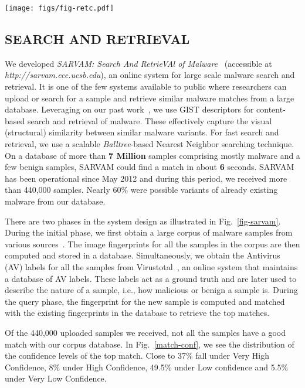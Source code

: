 \documentclass[journal]{IEEEtran}
\begin{document}
\begin{figure*}[t]
\centering
{\texttt{[image: figs/fig-retc.pdf]}}
\caption{Block Schematic of SARVAM}
\label{fig-sarvam}
\end{figure*} 

\subsection*{SEARCH AND RETRIEVAL}

 We developed \emph{SARVAM: Search And RetrieVAl of Malware}~\cite{sarvam} (accessible at {\it http://sarvam.ece.ucsb.edu}), an online system for large scale malware search and retrieval.
It is one of the few systems available to public where researchers can upload or search for a sample and retrieve similar malware matches from a large database.
Leveraging on our past work~\cite{malw-imgs}, we use GIST descriptors for content-based search and retrieval of malware.
These effectively capture the visual (structural) similarity between similar malware variants.
For fast search and retrieval, we use a scalable \emph{Balltree}-based Nearest Neighbor searching technique.
On a database of more than {\bf 7 Million} samples comprising mostly malware and a few benign samples, SARVAM could find a match in about {\bf 6} seconds.  
SARVAM has been operational since May 2012 and during this period, we received more than 440,000 samples.
Nearly 60\% were possible variants of already existing malware from our database.

  There are two phases in the system design as illustrated in Fig.~\ref{fig-sarvam}.
During the initial phase, we first obtain a large corpus of malware samples from various sources~.
The image fingerprints for all the samples in the corpus are then computed and stored in a database.
Simultaneously, we obtain the Antivirus (AV) labels for all the samples from Virustotal~\cite{vtotal}, an online system that maintains a database of AV labels.
These labels act as a ground truth and are later used to describe the nature of a sample, i.e., how malicious or benign a sample is.
During the query phase, the fingerprint for the new sample is computed and matched with the existing fingerprints in the database to retrieve the top matches.

 Of the 440,000 uploaded samples we received, not all the samples have a good match with our corpus database.
In Fig.~\ref{match-conf}, we see the distribution of the confidence levels of the top match.
Close to 37\% fall under Very High Confidence, 8\% under High Confidence, 49.5\% under Low confidence and  5.5\% under Very Low Confidence.
\end{document}
